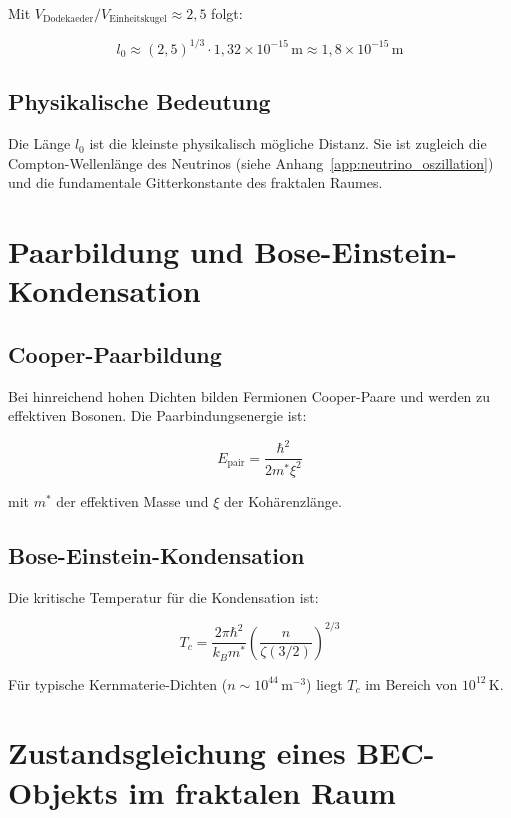 Mit \( V_{\text{Dodekaeder}} / V_{\text{Einheitskugel}} \approx 2,5 \) folgt:

\[
l_0 \approx (2,5)^{1/3} \cdot 1,32 \times 10^{-15} \, \text{m} \approx 1,8 \times 10^{-15} \, \text{m} \tag{K.2}
\]

\subsection{Physikalische Bedeutung}
\label{sub:bec_l0_bedeutung}

Die Länge \( l_0 \) ist die kleinste physikalisch mögliche Distanz. 
Sie ist zugleich die Compton-Wellenlänge des Neutrinos 
(siehe Anhang~\ref{app:neutrino_oszillation}) und die fundamentale Gitterkonstante des fraktalen Raumes.

\section{Paarbildung und Bose-Einstein-Kondensation}
\label{app:bec_paarbildung}

\subsection{Cooper-Paarbildung}
\label{sub:bec_cooper}

Bei hinreichend hohen Dichten bilden Fermionen Cooper-Paare und werden 
zu effektiven Bosonen. Die Paarbindungsenergie ist:

\[
E_{\text{pair}} = \frac{\hbar^2}{2m^* \xi^2} \tag{K.3}
\]

mit \( m^* \) der effektiven Masse und \( \xi \) der Kohärenzlänge.

\subsection{Bose-Einstein-Kondensation}
\label{sub:bec_kondensation}

Die kritische Temperatur für die Kondensation ist:

\[
T_c = \frac{2\pi \hbar^2}{k_B m^*} \left( \frac{n}{\zeta(3/2)} \right)^{2/3} \tag{K.4}
\]

Für typische Kernmaterie-Dichten (\( n \sim 10^{44} \, \text{m}^{-3} \)) 
liegt \( T_c \) im Bereich von \( 10^{12} \, \text{K} \).

\section{Zustandsgleichung eines BEC-Objekts im fraktalen Raum}
\label{app:bec_zustandsgleichung}

